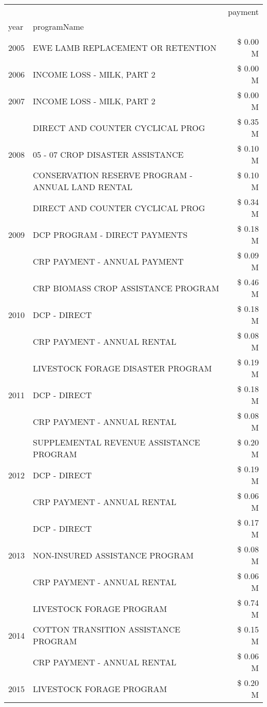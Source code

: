 \begin{tabular}{llr}
\toprule
 &  & payment \\
year & programName &  \\
\midrule
2005 & EWE LAMB REPLACEMENT OR RETENTION & \$ 0.00 M \\
\cline{1-3}
2006 & INCOME LOSS - MILK, PART 2 & \$ 0.00 M \\
\cline{1-3}
2007 & INCOME LOSS - MILK, PART 2 & \$ 0.00 M \\
\cline{1-3}
\multirow[t]{3}{*}{2008} & DIRECT AND COUNTER CYCLICAL PROG & \$ 0.35 M \\
 & 05 - 07 CROP DISASTER ASSISTANCE & \$ 0.10 M \\
 & CONSERVATION RESERVE PROGRAM - ANNUAL LAND RENTAL & \$ 0.10 M \\
\cline{1-3}
\multirow[t]{3}{*}{2009} & DIRECT AND COUNTER CYCLICAL PROG & \$ 0.34 M \\
 & DCP PROGRAM - DIRECT PAYMENTS & \$ 0.18 M \\
 & CRP PAYMENT - ANNUAL PAYMENT & \$ 0.09 M \\
\cline{1-3}
\multirow[t]{3}{*}{2010} & CRP BIOMASS CROP ASSISTANCE PROGRAM & \$ 0.46 M \\
 & DCP - DIRECT & \$ 0.18 M \\
 & CRP PAYMENT - ANNUAL RENTAL & \$ 0.08 M \\
\cline{1-3}
\multirow[t]{3}{*}{2011} & LIVESTOCK FORAGE DISASTER PROGRAM & \$ 0.19 M \\
 & DCP - DIRECT & \$ 0.18 M \\
 & CRP PAYMENT - ANNUAL RENTAL & \$ 0.08 M \\
\cline{1-3}
\multirow[t]{3}{*}{2012} & SUPPLEMENTAL REVENUE ASSISTANCE PROGRAM & \$ 0.20 M \\
 & DCP - DIRECT & \$ 0.19 M \\
 & CRP PAYMENT - ANNUAL RENTAL & \$ 0.06 M \\
\cline{1-3}
\multirow[t]{3}{*}{2013} & DCP - DIRECT & \$ 0.17 M \\
 & NON-INSURED ASSISTANCE PROGRAM & \$ 0.08 M \\
 & CRP PAYMENT - ANNUAL RENTAL & \$ 0.06 M \\
\cline{1-3}
\multirow[t]{3}{*}{2014} & LIVESTOCK FORAGE PROGRAM & \$ 0.74 M \\
 & COTTON TRANSITION ASSISTANCE PROGRAM & \$ 0.15 M \\
 & CRP PAYMENT - ANNUAL RENTAL & \$ 0.06 M \\
\cline{1-3}
\multirow[t]{3}{*}{2015} & LIVESTOCK FORAGE PROGRAM & \$ 0.20 M \\

\end{tabular}
